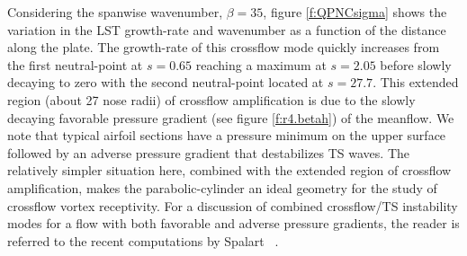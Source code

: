 Considering the spanwise wavenumber, $\beta = 35$, figure \ref{f:QPNCsigma}
shows the variation in the LST growth-rate and wavenumber as a function of the
distance along the plate.  The growth-rate of this crossflow mode quickly
increases from the first neutral-point at $s = 0.65$ reaching a maximum at $s
= 2.05$ before slowly decaying to zero with the second neutral-point located
at $s = 27.7$.  This extended region (about 27 nose radii) of crossflow
amplification is due to the slowly decaying favorable pressure gradient (see
figure \ref{f:r4.betah}) of the meanflow.  We note that typical airfoil
sections have a pressure minimum on the upper surface followed by an adverse
pressure gradient that destabilizes TS waves.  The relatively simpler
situation here, combined with the extended region of crossflow amplification,
makes the parabolic-cylinder an ideal geometry for the study of crossflow
vortex receptivity.  For a discussion of combined crossflow/TS instability
modes for a flow with both favorable and adverse pressure gradients, the
reader is referred to the recent computations by Spalart \etal\
\cite{SpCrNg:94}.

